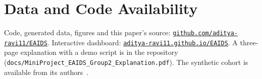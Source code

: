 \documentclass[conference]{IEEEtran}
\newcommand{\repo}{\href{https://github.com/aditya-ravi11/EAIDS}{\texttt{github.com/aditya-ravi11/EAIDS}}}
\newcommand{\site}{\href{https://aditya-ravi11.github.io/EAIDS/}{\texttt{aditya-ravi11.github.io/EAIDS}}}
\begin{document}
\section*{Data and Code Availability}
Code, generated data, figures and this paper's source: \repo. Interactive dashboard: \site. A three-page explanation with a demo script is in the repository (\nolinkurl{docs/MiniProject_EAIDS_Group2_Explanation.pdf}). The synthetic cohort is available from its authors~\cite{labsysmed}.



\end{document}
